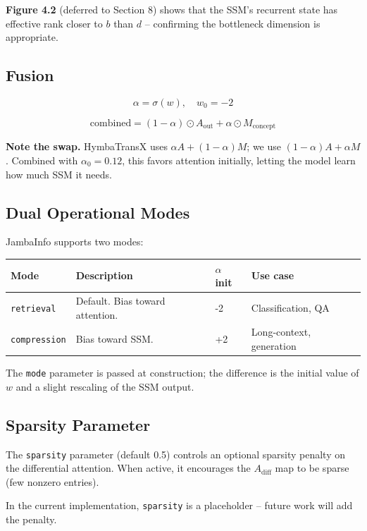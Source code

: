\textbf{Figure 4.2} (deferred to Section 8) shows that the SSM's recurrent 
state has effective rank closer to $b$ than $d$ -- confirming the 
bottleneck dimension is appropriate.

\subsection{Fusion}

\[
\alpha = \sigma(w), \quad w_0 = -2
\tag{4.9}
\]

\[
\text{combined} = (1 - \alpha) \odot A_\text{out} + \alpha \odot M_\text{concept}
\tag{4.10}
\]

\textbf{Note the swap.} HymbaTransX uses $\alpha A + (1-\alpha) M$; we use 
$(1-\alpha) A + \alpha M$. Combined with $\alpha_0 = 0.12$, this favors 
attention initially, letting the model learn how much SSM it needs.

\subsection{Dual Operational Modes}

JambaInfo supports two modes:

\begin{table}[H]
\centering
\small
\begin{tabular}{llll}
\toprule
\textbf{Mode} & \textbf{Description} & \textbf{$\alpha$ init} & \textbf{Use case} \\
\midrule
\texttt{retrieval} & Default. Bias toward attention. & -2 & Classification, QA \\
\texttt{compression} & Bias toward SSM. & +2 & Long-context, generation \\
\bottomrule
\end{tabular}
\end{table}

The \texttt{mode} parameter is passed at construction; the difference is the 
initial value of $w$ and a slight rescaling of the SSM output.

\subsection{Sparsity Parameter}

The \texttt{sparsity} parameter (default 0.5) controls an optional sparsity 
penalty on the differential attention. When active, it encourages the 
$A_\text{diff}$ map to be sparse (few nonzero entries).

In the current implementation, \texttt{sparsity} is a placeholder -- future work 
will add the penalty.


